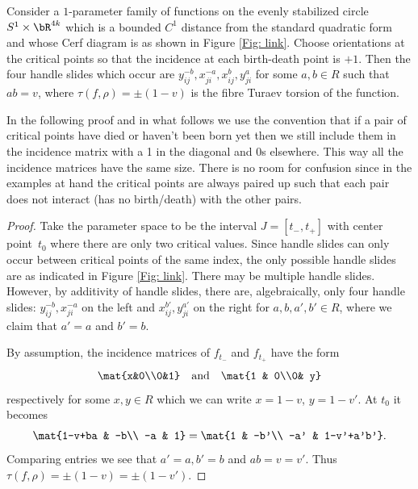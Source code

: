\begin{lemma}\label{lem: ab=v}
Consider a $1$-parameter family of functions on the evenly stabilized circle $S^1\times \bR^{4k}$ which is a bounded $C^1$ distance from the standard quadratic form and whose Cerf diagram is as shown in Figure \ref{Fig: link}. Choose orientations at the critical points so that the incidence at each birth-death point is $+1$. Then the four handle slides which occur are $y_{ij}^{-b},x_{ji}^{-a}, x_{ij}^{b},y_{ji}^{a}$ for some $a,b\in R$ such that
$ab=v$, where $\tau(f,\rho)=\pm(1-v)$ is the fibre Turaev torsion of the function.
\end{lemma}

\begin{remark}
In the following proof and in what follows we use the convention that if a pair of critical points have died or haven't been born yet then we still include them in the incidence matrix with a 1 in the diagonal and 0s elsewhere. This way all the incidence matrices have the same size. There is no room for confusion since in the examples at hand the critical points are always paired up such that each pair does not interact (\ie has no birth/death) with the other pairs.
\end{remark}

\begin{proof}
Take the parameter space to be the interval $J=[t_-,t_+]$ with center point~$t_0$ where there are only two critical values. Since handle slides can only occur between critical points of the same index, the only possible handle slides are as indicated in Figure \ref{Fig: link}. There may be multiple handle slides. However, by additivity of handle slides, there are, algebraically, only four handle slides: $y_{ij}^{-b}, x_{ji}^{-a}$ on the left and $x_{ij}^{b'},y_{ji}^{a'}$ on the right for $a,b,a',b'\in R$, where we claim that $a'=a$ and $b'=b$.

By assumption, the incidence matrices of $f_{t_-}$ and $f_{t_+}$ have the form
\[\arraycolsep4.5pt
\mat{x&0\\0&1}\quad\text{and}\quad \mat{1 & 0\\0& y}
\]
respectively for some $x,y\in R$ which we can write $x=1-v$, $y=1-v'$. At $t_0$ it becomes
\[\arraycolsep4.5pt
\mat{1-v+ba & -b\\ -a & 1}=\mat{1 & -b'\\ -a' & 1-v'+a'b'}.
\]
Comparing entries we see that $a'=a, b'=b$ and $ab=v=v'$. Thus $\tau(f,\rho)=\pm(1-v )=\pm(1-v' )$.
\end{proof}

